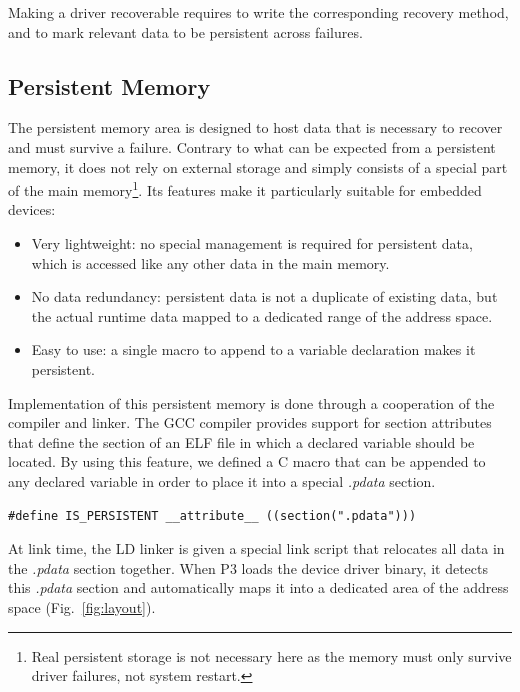 \documentclass{report}
\begin{document}
Making a driver recoverable requires to write the corresponding recovery method, and to mark relevant data to be persistent across failures.

\subsection{Persistent Memory}

The persistent memory area is designed to host data that is necessary to recover and must survive a failure. Contrary to what can be expected from a persistent memory, it does not rely on external storage and simply consists of a special part of the main memory\footnote{Real persistent storage is not necessary here as the memory must only survive driver failures, not system restart.}. Its features make it particularly suitable for embedded devices:
\begin{itemize}
\item Very lightweight: no special management is required for persistent data, which is accessed like any other data in the main memory.
\item No data redundancy: persistent data is not a duplicate of existing data, but the actual runtime data mapped to a dedicated range of the address space.
\item Easy to use: a single macro to append to a variable declaration makes it persistent.
\end{itemize}

Implementation of this persistent memory is done through a cooperation of the compiler and linker. The GCC compiler\cite{GCCManual} provides support for section attributes that define the section of an ELF\cite{ELFSpec} file in which a declared variable should be located. By using this feature, we defined a C macro that can be appended to any declared variable in order to place it into a special \emph{.pdata} section.

\begin{verbatim}
#define IS_PERSISTENT __attribute__ ((section(".pdata")))
\end{verbatim}

At link time, the LD linker is given a special link script that relocates all data in the \emph{.pdata} section together. When P3 loads the device driver binary, it detects this \emph{.pdata} section and automatically maps it into a dedicated area of the address space (Fig.~\ref{fig:layout}).
\end{document}
